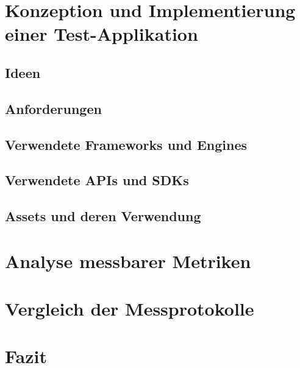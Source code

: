 \chapter{Konzeption und Implementierung einer Test-Applikation}
\section{Ideen}
\section{Anforderungen}
\section{Verwendete Frameworks und Engines}
\section{Verwendete APIs und SDKs}
\section{Assets und deren Verwendung}

\chapter{Analyse messbarer Metriken}

\chapter{Vergleich der Messprotokolle}

\chapter{Fazit}




\listoffigures %
\listoftables %

